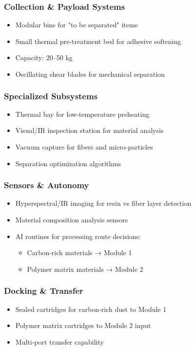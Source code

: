 \documentclass[12pt, a4paper]{article}
\begin{document}
\subsubsection{Collection \& Payload Systems}
\begin{itemize}
    \item Modular bins for "to be separated" items
    \item Small thermal pre-treatment bed for adhesive softening
    \item Capacity: 20–50 kg
    \item Oscillating shear blades for mechanical separation
\end{itemize}

\subsubsection{Specialized Subsystems}
\begin{itemize}
    \item Thermal bay for low-temperature preheating
    \item Visual/IR inspection station for material analysis
    \item Vacuum capture for fibers and micro-particles
    \item Separation optimization algorithms
\end{itemize}

\subsubsection{Sensors \& Autonomy}
\begin{itemize}
    \item Hyperspectral/IR imaging for resin vs fiber layer detection
    \item Material composition analysis sensors
    \item AI routines for processing route decisions:
    \begin{itemize}
        \item Carbon-rich materials → Module 1
        \item Polymer matrix materials → Module 2
    \end{itemize}
\end{itemize}

\subsubsection{Docking \& Transfer}
\begin{itemize}
    \item Sealed cartridges for carbon-rich dust to Module 1
    \item Polymer matrix cartridges to Module 2 input
    \item Multi-port transfer capability
\end{itemize}
\end{document}
